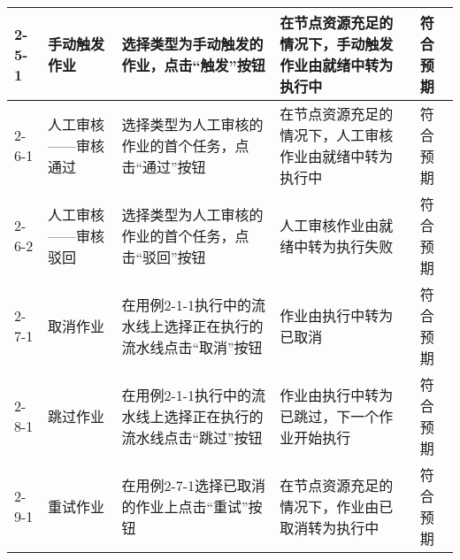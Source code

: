 \begin{table}[ht]
\begin{tabular}{|p{1.5cm}|p{2.5cm}|p{3cm}|p{3cm}|p{1.5cm}|}
  2-5-1 & 手动触发作业 & 选择类型为手动触发的作业，点击“触发”按钮 & 在节点资源充足的情况下，手动触发作业由就绪中转为执行中 & 符合预期 \\ \hline
  2-6-1 & 人工审核\newline——审核通过 & 选择类型为人工审核的作业的首个任务，点击“通过”按钮 & 在节点资源充足的情况下，人工审核作业由就绪中转为执行中 & 符合预期 \\ \hline
  2-6-2 & 人工审核\newline——审核驳回 & 选择类型为人工审核的作业的首个任务，点击“驳回”按钮 & 人工审核作业由就绪中转为执行失败 & 符合预期 \\ \hline
  2-7-1 & 取消作业 & 在用例2-1-1执行中的流水线上选择正在执行的流水线点击“取消”按钮 & 作业由执行中转为已取消 & 符合预期 \\ \hline
  2-8-1 & 跳过作业 & 在用例2-1-1执行中的流水线上选择正在执行的流水线点击“跳过”按钮 & 作业由执行中转为已跳过，下一个作业开始执行 & 符合预期 \\ \hline
  2-9-1 & 重试作业 & 在用例2-7-1选择已取消的作业上点击“重试”按钮 & 在节点资源充足的情况下，作业由已取消转为执行中 & 符合预期 \\ \hline
  \end{tabular}
\end{table}


